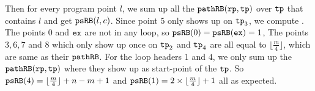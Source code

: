 Then for every program point $l$, we sum up all the $\mathtt{pathRB}(\mathtt{rp}, \mathtt{tp})$ over $\mathtt{tp}$ that contains $l$ and get $\mathtt{psRB}(l, c)$.
Since point $5$ only shows up on $\mathtt{tp}_3$, we compute .
The points $0$ and $\mathtt{ex}$ are not in any loop, so $\mathtt{psRB}(0) = \mathtt{psRB}(\mathtt{ex}) = 1$,
The points $3, 6, 7$ and $8$ which only show up once on $\mathtt{tp}_2$ and $\mathtt{tp}_4$ are all equal to $\lfloor\frac{m}{4}\rfloor$, which are same as their $\mathtt{pathRB}$.
For the loop headers $1$ and $4$, we only sum up the $\mathtt{pathRB}(\mathtt{rp}, \mathtt{tp})$ where they show up as start-point of the $\mathtt{tp}$.
So $\mathtt{psRB}(4) =  \lfloor\frac{m}{4}\rfloor + n - m + 1$ and $\mathtt{psRB}(1) = 2 \times \lfloor\frac{m}{4}\rfloor + 1$ all as expected.



